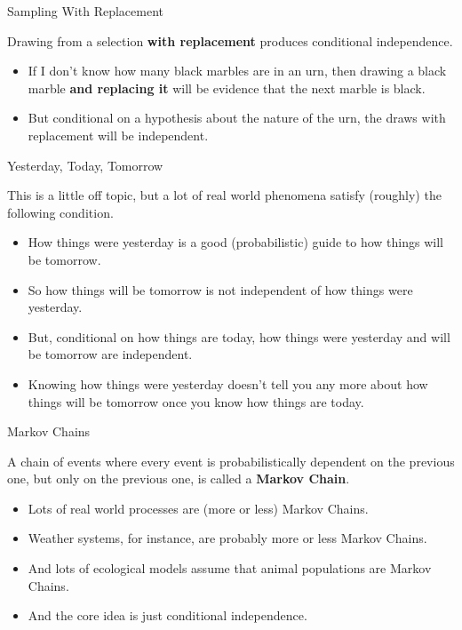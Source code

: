\documentclass[
  ignorenonframetext,
]{beamer}
\providecommand{\tightlist}{%
  \setlength{\itemsep}{0pt}\setlength{\parskip}{0pt}}
\renewcommand{\,}{\text{, }}
\begin{document}
\begin{frame}{Sampling With Replacement}
\protect\hypertarget{sampling-with-replacement}{}

Drawing from a selection \textbf{with replacement} produces conditional
independence.

\begin{itemize}
\tightlist
\item
  If I don't know how many black marbles are in an urn, then drawing a
  black marble \textbf{and replacing it} will be evidence that the next
  marble is black.
\item
  But conditional on a hypothesis about the nature of the urn, the draws
  with replacement will be independent.
\end{itemize}

\end{frame}

\begin{frame}{Yesterday, Today, Tomorrow}
\protect\hypertarget{yesterday-today-tomorrow}{}

This is a little off topic, but a lot of real world phenomena satisfy
(roughly) the following condition.

\begin{itemize}
\tightlist
\item
  How things were yesterday is a good (probabilistic) guide to how
  things will be tomorrow.
\item
  So how things will be tomorrow is not independent of how things were
  yesterday. \pause
\item
  But, conditional on how things are today, how things were yesterday
  and will be tomorrow are independent.
\item
  Knowing how things were yesterday doesn't tell you any more about how
  things will be tomorrow once you know how things are today.
\end{itemize}

\end{frame}

\begin{frame}{Markov Chains}
\protect\hypertarget{markov-chains}{}

A chain of events where every event is probabilistically dependent on
the previous one, but only on the previous one, is called a
\textbf{Markov Chain}. \pause

\begin{itemize}
\tightlist
\item
  Lots of real world processes are (more or less) Markov Chains.
\item
  Weather systems, for instance, are probably more or less Markov
  Chains.
\item
  And lots of ecological models assume that animal populations are
  Markov Chains.
\item
  And the core idea is just conditional independence.
\end{itemize}

\end{frame}
\end{document}
